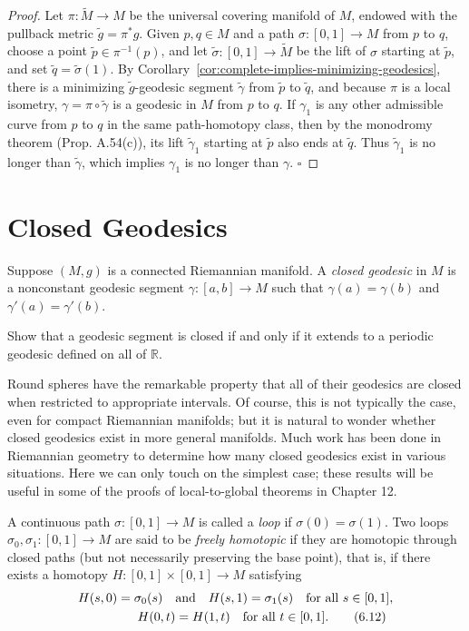 \begin{proof}
Let $\pi: \tilde{M} \to M$ be the universal covering manifold of $M$, endowed with the pullback metric $\tilde{g} = \pi^* g$. Given $p, q \in M$ and a path $\sigma: [0, 1] \to M$ from $p$ to $q$, choose a point $\tilde{p} \in \pi^{-1}(p)$, and let $\tilde{\sigma}: [0, 1] \to \tilde{M}$ be the lift of $\sigma$ starting at $\tilde{p}$, and set $\tilde{q} = \tilde{\sigma}(1)$. By Corollary~\ref{cor:complete-implies-minimizing-geodesics}, there is a minimizing $\tilde{g}$-geodesic segment $\tilde{\gamma}$ from $\tilde{p}$ to $\tilde{q}$, and because $\pi$ is a local isometry, $\gamma = \pi \circ \tilde{\gamma}$ is a geodesic in $M$ from $p$ to $q$. If $\gamma_1$ is any other admissible curve from $p$ to $q$ in the same path-homotopy class, then by the monodromy theorem (Prop. A.54(c)), its lift $\tilde{\gamma}_1$ starting at $\tilde{p}$ also ends at $\tilde{q}$. Thus $\tilde{\gamma}_1$ is no longer than $\tilde{\gamma}$, which implies $\gamma_1$ is no longer than $\gamma$. $\square$
\end{proof}

\section{Closed Geodesics}

Suppose $(M, g)$ is a connected Riemannian manifold. A \emph{closed geodesic} in $M$ is a nonconstant geodesic segment $\gamma: [a, b] \to M$ such that $\gamma(a) = \gamma(b)$ and $\gamma'(a) = \gamma'(b)$.

\begin{exercise}
\label{exer:closed-geodesic-periodic-extension}

Show that a geodesic segment is closed if and only if it extends to a periodic geodesic defined on all of $\mathbb{R}$.
\end{exercise}

Round spheres have the remarkable property that all of their geodesics are closed when restricted to appropriate intervals. Of course, this is not typically the case, even for compact Riemannian manifolds; but it is natural to wonder whether closed geodesics exist in more general manifolds. Much work has been done in Riemannian geometry to determine how many closed geodesics exist in various situations. Here we can only touch on the simplest case; these results will be useful in some of the proofs of local-to-global theorems in Chapter 12.

A continuous path $\sigma : [0,1] \to M$ is called a \emph{loop} if $\sigma(0) = \sigma(1)$. Two loops $\sigma_0, \sigma_1 : [0,1] \to M$ are said to be \emph{freely homotopic} if they are homotopic through closed paths (but not necessarily preserving the base point), that is, if there exists a homotopy $H : [0,1] \times [0,1] \to M$ satisfying
\begin{align}
H(s,0) = \sigma_0(s) \quad &\text{and} \quad H(s,1) = \sigma_1(s) \quad \text{for all } s \in [0,1], \notag\\
H(0,t) &= H(1,t) \quad \text{for all } t \in [0,1]. \tag{6.12}
\end{align}

